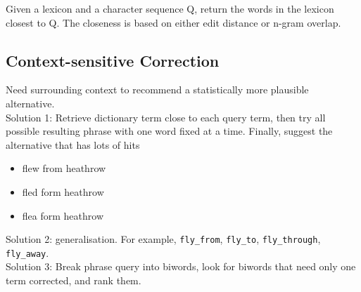 \begin{multicols*}{2}
\noindent Given a lexicon and a character sequence Q, return the words in the lexicon closest to Q. The closeness is based on either edit distance or n-gram overlap. 

\subsection{Context-sensitive Correction}

\noindent Need surrounding context to recommend a statistically more plausible alternative. \\

\noindent Solution 1: Retrieve dictionary term close to each query term, then try all possible resulting phrase with one word fixed at a time. Finally, suggest the alternative that has lots of hits
\begin{itemize}
    \item flew from heathrow
    \item fled form heathrow
    \item flea form heathrow
\end{itemize}

\noindent Solution 2: generalisation. For example, \verb|fly_from|, \verb|fly_to|, \verb|fly_through|, \verb|fly_away|. \\

\noindent Solution 3: Break phrase query into biwords, look for biwords that need only one term corrected, and rank them. 

\end{multicols*}
